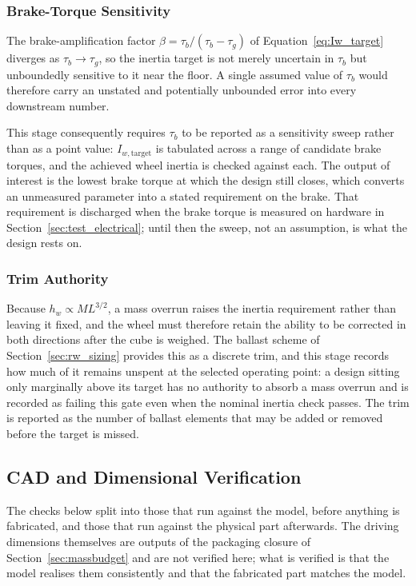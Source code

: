 \subsubsection{Brake-Torque Sensitivity}

The brake-amplification factor $\beta = \tau_b/(\tau_b - \tau_g)$ of
Equation~\eqref{eq:Iw_target} diverges as $\tau_b \to \tau_g$, so the inertia
target is not merely uncertain in $\tau_b$ but unboundedly sensitive to it near
the floor. A single assumed value of $\tau_b$ would therefore carry an unstated
and potentially unbounded error into every downstream number.

This stage consequently requires $\tau_b$ to be reported as a sensitivity sweep
rather than as a point value: $I_{w,\text{target}}$ is tabulated across a range
of candidate brake torques, and the achieved wheel inertia is checked against
each. The output of interest is the lowest brake torque at which the design still
closes, which converts an unmeasured parameter into a stated requirement on the
brake. That requirement is discharged when the brake torque is measured on
hardware in Section~\ref{sec:test_electrical}; until then the sweep, not an
assumption, is what the design rests on.

\subsubsection{Trim Authority}

Because $h_w \propto M L^{3/2}$, a mass overrun raises the inertia requirement
rather than leaving it fixed, and the wheel must therefore retain the ability to
be corrected in both directions after the cube is weighed. The ballast scheme of
Section~\ref{sec:rw_sizing} provides this as a discrete trim, and this stage
records how much of it remains unspent at the selected operating point: a design
sitting only marginally above its target has no authority to absorb a mass
overrun and is recorded as failing this gate even when the nominal inertia check
passes. The trim is reported as the number of ballast elements that may be added
or removed before the target is missed.

\subsection{CAD and Dimensional Verification}
\label{sec:test_cad}

The checks below split into those that run against the model, before anything is
fabricated, and those that run against the physical part afterwards. The driving
dimensions themselves are outputs of the packaging closure of
Section~\ref{sec:massbudget} and are not verified here; what is verified is that
the model realises them consistently and that the fabricated part matches the
model.

